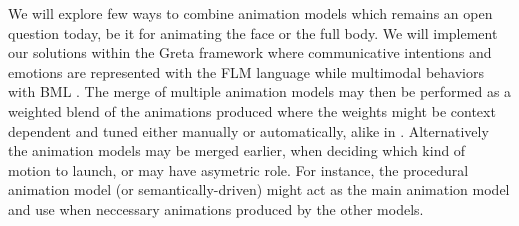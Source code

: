 We will explore few ways to combine animation models which remains an open question today, be it for animating the face or the full body. We will implement our solutions within the Greta framework where communicative intentions and emotions are represented with the FLM language while multimodal behaviors with BML \cite{DBLP:conf/iva/VilhjalmssonCCCKKMMMPRTWW07}. The merge of multiple animation models may then be performed as a weighted blend of the animations produced where the weights might be context dependent and tuned either manually or automatically, alike in \cite{DBLP:journals/tvcg/ShoulsonMKB14}. Alternatively the animation models may be merged earlier, when deciding which kind of motion to launch, or may have asymetric role. For instance, the procedural animation model (or semantically-driven) might act as the main animation model and use when neccessary animations produced by the other models.




% 
% 

